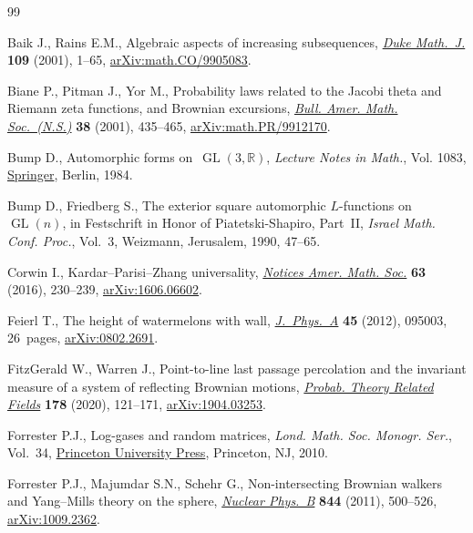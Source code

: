 \documentclass[pdftex]{sigma}
\theoremstyle{definition}
\begin{document}
\begin{thebibliography}{99}
\footnotesize\itemsep=0pt

Baik J., Rains E.M., Algebraic aspects of increasing subsequences,
 \href{https://doi.org/10.1215/S0012-7094-01-10911-3}{\textit{Duke Math.~J.}}
 \textbf{109} (2001), 1--65,
 \href{http://arxiv.org/abs/math.CO/9905083}{arXiv:math.CO/9905083}.

Biane P., Pitman J., Yor M., Probability laws related to the {J}acobi theta and
 {R}iemann zeta functions, and {B}rownian excursions,
 \href{https://doi.org/10.1090/S0273-0979-01-00912-0}{\textit{Bull. Amer.
 Math. Soc.~(N.S.)}} \textbf{38} (2001), 435--465,
 \href{http://arxiv.org/abs/math.PR/9912170}{arXiv:math.PR/9912170}.

Bump D., Automorphic forms on~{$\operatorname{GL}(3,{\mathbb R})$},
 \textit{Lecture Notes in Math.}, Vol. 1083,
 \href{https://doi.org/10.1007/BFb0100147}{Springer}, Berlin, 1984.

Bump D., Friedberg S., The exterior square automorphic {$L$}-functions
 on~{$\operatorname{GL}(n)$}, in Festschrift in {H}onor of
 {P}iatetski-{S}hapiro, {P}art~{II}, \textit{Israel Math. Conf. Proc.},
 Vol.~3, Weizmann, Jerusalem, 1990, 47--65.

Corwin I., Kardar--{P}arisi--{Z}hang universality,
 \href{https://doi.org/10.1090/noti1334}{\textit{Notices Amer. Math. Soc.}}
 \textbf{63} (2016), 230--239,
 \href{http://arxiv.org/abs/1606.06602}{arXiv:1606.06602}.

Feierl T., The height of watermelons with wall,
 \href{https://doi.org/10.1088/1751-8113/45/9/095003}{\textit{J.~Phys.~A}}
 \textbf{45} (2012), 095003, 26~pages,
 \href{http://arxiv.org/abs/0802.2691}{arXiv:0802.2691}.

FitzGerald W., Warren J., Point-to-line last passage percolation and the
 invariant measure of a system of reflecting {B}rownian motions,
 \href{https://doi.org/10.1007/s00440-020-00972-z}{\textit{Probab. Theory
 Related Fields}} \textbf{178} (2020), 121--171,
 \href{http://arxiv.org/abs/1904.03253}{arXiv:1904.03253}.

Forrester P.J., Log-gases and random matrices, \textit{Lond. Math. Soc. Monogr.
 Ser.}, Vol.~34, \href{https://doi.org/10.1515/9781400835416}{Princeton
 University Press}, Princeton, NJ, 2010.

Forrester P.J., Majumdar S.N., Schehr G., Non-intersecting {B}rownian walkers
 and {Y}ang--{M}ills theory on the sphere,
 \href{https://doi.org/10.1016/j.nuclphysb.2010.11.013}{\textit{Nuclear
 Phys.~B}} \textbf{844} (2011), 500--526,
 \href{http://arxiv.org/abs/1009.2362}{arXiv:1009.2362}.


\end{thebibliography}
\end{document}
